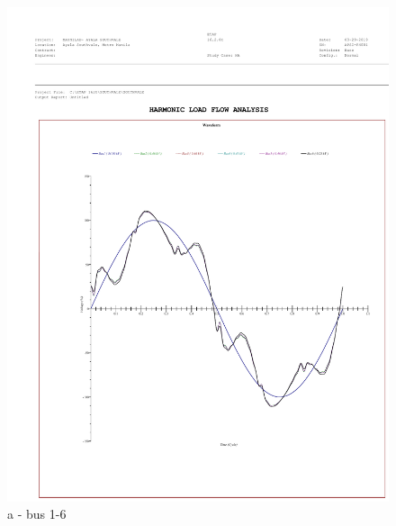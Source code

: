 \begin{figure}
	\begin{minipage}[b]{0.4\linewidth}
		\centering
		\includegraphics[width=\textwidth]{figures/fig_ch04_elecaudit_bus_harmonic_waveform16}
		\caption*{a - bus 1-6}
	\end{minipage}
	\hspace{0.05cm}
	\begin{minipage}[b]{0.4\linewidth}
		\centering

\end{minipage}
\end{figure}
